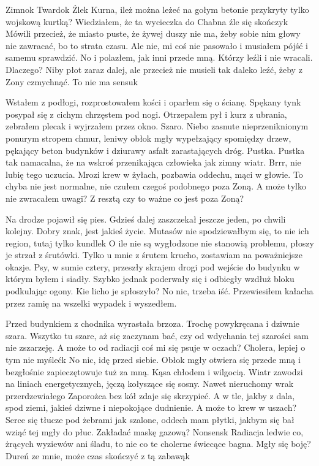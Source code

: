 \documentclass[../MAIN.tex]{subfiles}
\begin{document}
%
Zimno\3k Twardo\3k Źle\3k Kurna, ileż można leżeć na gołym betonie przykryty tylko wojskową kurtką? Wiedziałem, że ta wycieczka do Chabna źle się skończy\3k Mówili przecież, że miasto puste, że żywej duszy nie ma, żeby sobie nim głowy nie zawracać, bo to strata czasu. Ale nie, mi coś nie pasowało i musiałem pójść i samemu sprawdzić. No i polazłem, jak inni przede mną. Którzy leźli i nie wracali. Dlaczego? Niby płot zaraz dalej, ale przecież nie musieli tak daleko leźć, żeby z Zony czmychnąć. To nie ma sensu\3k

Wstałem z podłogi, rozprostowałem kości i oparłem się o ścianę. Spękany tynk posypał się z cichym chrzęstem pod nogi. Otrzepałem pył i kurz z ubrania, zebrałem plecak i wyjrzałem przez okno. Szaro. Niebo zasnute nieprzeniknionym ponurym stropem chmur, leniwy obłok mgły wypełzający spomiędzy drzew, pękający beton budynków i dziurawy asfalt zarastających dróg. Pustka. Pustka tak namacalna, że na wskroś przenikająca człowieka jak zimny wiatr. Brrr, nie lubię tego uczucia. Mrozi krew w żyłach, pozbawia oddechu, mąci w głowie. To chyba nie jest normalne, nie czułem czegoś podobnego poza Zoną. A może tylko nie zwracałem uwagi? Z resztą czy to ważne co jest poza Zoną?

Na drodze pojawił się pies. Gdzieś dalej zaszczekał jeszcze jeden, po chwili kolejny. Dobry znak, jest jakieś życie. Mutasów nie spodziewałbym się, to nie ich region, tutaj tylko kundle\3k O ile nie są wygłodzone nie stanowią problemu, płoszy je strzał z śrutówki. Tylko u mnie z śrutem krucho, zostawiam na poważniejsze okazje. Psy, w sumie cztery, przeszły skrajem drogi pod wejście do budynku w którym byłem i siadły. Szybko jednak poderwały się i odbiegły wzdłuż bloku podkulając ogony. Kie licho je spłoszyło? No nic, trzeba iść. Przewiesiłem kałacha przez ramię na wszelki wypadek i wyszedłem.

Przed budynkiem z chodnika wyrastała brzoza. Trochę powykręcana i dziwnie szara. Wszytko tu szare, aż się zaczynam bać, czy od wdychania tej szarości sam nie zszarzeję. A może to od radiacji coś mi się psuje w oczach? Cholera, lepiej o tym nie myśleć\3k No nic, idę przed siebie. Obłok mgły otwiera się przede mną i bezgłośnie zapieczętowuje tuż za mną. Kąsa chłodem i wilgocią. Wiatr zawodzi na liniach energetycznych, jęczą kołyszące się sosny. Nawet nieruchomy wrak przerdzewiałego Zaporożca bez kół zdaje się skrzypieć. A w tle, jakby z dala, spod ziemi, jakieś dziwne i niepokojące dudnienie. A może to krew w uszach? Serce się tłucze pod żebrami jak szalone, oddech mam płytki, jakbym się bał wziąć tej mgły do płuc. Zakładać maskę gazową? Nonsens\3k Radiacja ledwie co, żrących wyziewów ani śladu, to nie co te cholerne świecące bagna. Mgły się boję? Dureń ze mnie, może czas skończyć z tą zabawą\3k
\end{document}
